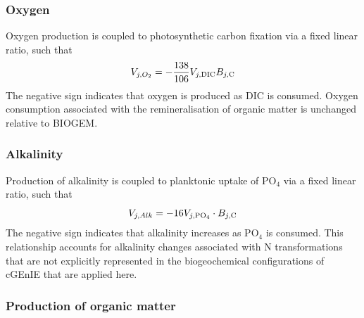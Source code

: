 \documentclass[gmd, manuscript]{copernicus}
\begin{document}
\subsubsection{Oxygen}

Oxygen production is coupled to photosynthetic carbon fixation via a fixed linear ratio, such that 
%
\begin{equation} 
V_{j,O_2} = -\frac{138}{106} V_{j,{\rm DIC}} B_{j,{\rm C}}
\end{equation}
%
The negative sign indicates that oxygen is produced as DIC is consumed. Oxygen consumption associated with the remineralisation of organic matter is unchanged relative to BIOGEM.
\subsubsection{Alkalinity}

Production of alkalinity is coupled to planktonic uptake of PO$_4$ via a fixed linear ratio, such that 
%
\begin{equation} 
V_{j,Alk} = -16 V_{j,{\rm PO_4}} \cdot B_{j,{\rm C}}
\end{equation}
%
The negative sign indicates that alkalinity increases as PO$_4$ is consumed. This relationship accounts for alkalinity changes associated with N transformations \citep{Zeebe:2001} that are not explicitly represented in the biogeochemical configurations of cGEnIE that are applied here.

\subsubsection{Production of organic matter}
\end{document}
